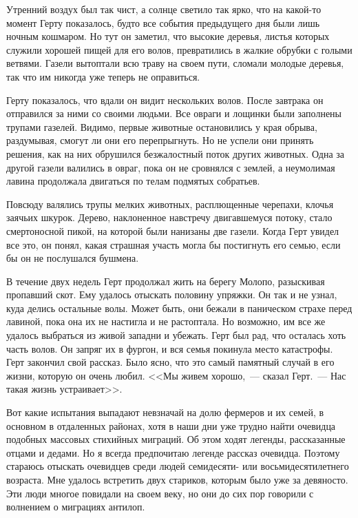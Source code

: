 \documentclass[12pt,a4paper,twoside,openany,svgnames]{memoir}
\begin{document}
Утренний воздух был так чист, а солнце светило так ярко, что на какой-то момент Герту показалось, будто все события предыдущего дня были лишь ночным кошмаром. Но тут он заметил, что высокие деревья, листья которых служили хорошей пищей для его волов, превратились в жалкие обрубки с голыми ветвями. Газели вытоптали всю траву на своем пути, сломали молодые деревья, так что им никогда уже теперь не оправиться.

Герту показалось, что вдали он видит нескольких волов. После завтрака он отправился за ними со своими людьми. Все овраги и лощинки были заполнены трупами газелей. Видимо, первые животные остановились у края обрыва, раздумывая, смогут ли они его перепрыгнуть. Но не успели они принять решения, как на них обрушился безжалостный поток других животных. Одна за другой газели валились в овраг, пока он не сровнялся с землей, а неумолимая лавина продолжала двигаться по телам подмятых собратьев.

Повсюду валялись трупы мелких животных, расплющенные черепахи, клочья заячьих шкурок. Дерево, наклоненное навстречу двигавшемуся потоку, стало смертоносной пикой, на которой были нанизаны две газели. Когда Герт увидел все это, он понял, какая страшная участь могла бы постигнуть его семью, если бы он не послушался бушмена.

В течение двух недель Герт продолжал жить на берегу Молопо, разыскивая пропавший скот. Ему удалось отыскать половину упряжки. Он так и не узнал, куда делись остальные волы. Может быть, они бежали в паническом страхе перед лавиной, пока она их не настигла и не растоптала. Но возможно, им все же удалось выбраться из живой западни и убежать. Герт был рад, что осталась хоть часть волов. Он запряг их в фургон, и вся семья покинула место катастрофы. Герт закончил свой рассказ. Было ясно, что это самый памятный случай в его жизни, которую он очень любил. <<Мы живем хорошо,~--- сказал Герт.~--- Нас такая жизнь устраивает>>.

Вот какие испытания выпадают невзначай на долю фермеров и их семей, в основном в отдаленных районах, хотя в наши дни уже трудно найти очевидца подобных массовых стихийных миграций. Об этом ходят легенды, рассказанные отцами и дедами. Но я всегда предпочитаю легенде рассказ очевидца. Поэтому стараюсь отыскать очевидцев среди людей семидесяти- или восьмидесятилетнего возраста. Мне удалось встретить двух стариков, которым было уже за девяносто. Эти люди многое повидали на своем веку, но они до сих пор говорили с волнением о миграциях антилоп.
\end{document}

